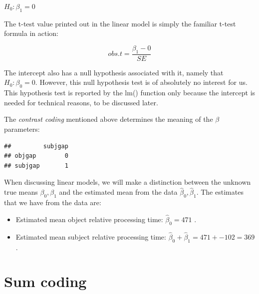 \documentclass[12pt,]{krantz}
\newenvironment{Shaded}{\begin{snugshade}}{\end{snugshade}}
\newcommand{\DataTypeTok}[1]{\textcolor[rgb]{0.13,0.29,0.53}{#1}}
\newcommand{\KeywordTok}[1]{\textcolor[rgb]{0.13,0.29,0.53}{\textbf{#1}}}
\newcommand{\NormalTok}[1]{#1}
\newcommand{\OperatorTok}[1]{\textcolor[rgb]{0.81,0.36,0.00}{\textbf{#1}}}
\newcommand{\StringTok}[1]{\textcolor[rgb]{0.31,0.60,0.02}{#1}}
\providecommand{\tightlist}{%
  \setlength{\itemsep}{0pt}\setlength{\parskip}{0pt}}
\begin{document}
\(H_0: \beta_1 = 0\)

The t-test value printed out in the linear model is simply the familiar t-test formula in action:

\begin{equation}
obs.t = \frac{\beta_1 - 0}{SE}
\end{equation}

The intercept also has a null hypothesis associated with it, namely that
\(H_0: \beta_0 = 0\). However, this null hypothesis test is of absolutely no interest for us. This hypothesis test is reported by the lm() function only because the intercept is needed for technical reasons, to be discussed later.

The \emph{contrast coding} mentioned above determines the meaning of the \(\beta\) parameters:

\begin{Shaded}
\end{Shaded}

\begin{verbatim}
##         subjgap
## objgap        0
## subjgap       1
\end{verbatim}

When discussing linear models, we will make a distinction between the unknown true means \(\beta_0, \beta_1\) and the estimated mean from the data \(\hat\beta_0, \hat\beta_1\). The estimates that we have from the data are:

\begin{itemize}
\tightlist
\item
  Estimated mean object relative processing time: \(\hat\beta_0=471\)
  .
\item
  Estimated mean subject relative processing time: \(\hat\beta_0+\hat\beta_1=471+-102=369\).
\end{itemize}

\hypertarget{sum-coding}{%
\section{Sum coding}\label{sum-coding}}
\end{document}
